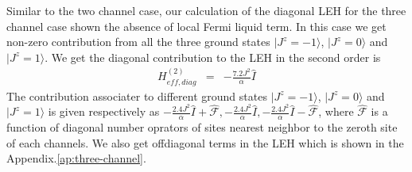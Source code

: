 \documentclass[reprint,prb,superscriptaddress]{revtex4-1}
\begin{document}
%
%

Similar to the two channel case, our calculation of the diagonal LEH for the three channel case shown the absence of local Fermi liquid term. In this case we get non-zero contribution from all the three ground states $|J^z=-1\rangle$, $|J^z=0\rangle$ and $|J^z=1\rangle$.
We get the diagonal contribution to the LEH in the second order is 
\begin{eqnarray}
H^{(2)}_{eff, diag} &=& - \frac{7.2 J^2}{\alpha} \hat{I}
\end{eqnarray}
The contribution associater to different ground states $|J^z=-1\rangle$, $|J^z=0\rangle$ and $|J^z=1\rangle$ is given respectively as $- \frac{2.4 J^2}{\alpha} \hat{I} + \hat{\mathcal{F}},- \frac{2.4 J^2}{\alpha} \hat{I} ,- \frac{2.4 J^2}{\alpha} \hat{I} - \hat{\mathcal{F} }$,
\noindent where $\hat{\mathcal{F}}$ is a function of diagonal number oprators of sites nearest neighbor to the zeroth site of each channels. We also get offdiagonal terms in the LEH which is shown in the Appendix.\ref{ap:three-channel}. 
\end{document}
